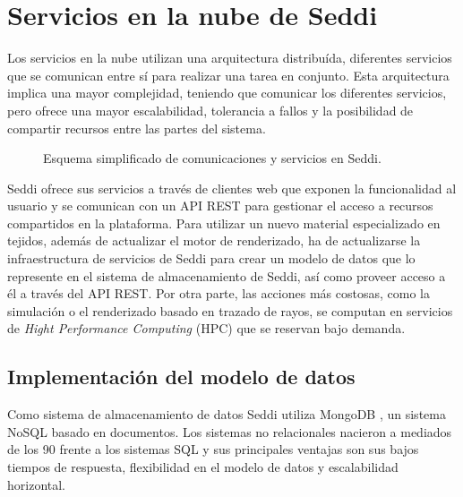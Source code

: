 \section{Servicios en la nube de Seddi}

\bgroup

  Los servicios en la nube utilizan una arquitectura distribu\'ida, diferentes servicios que se comunican entre s\'i para realizar
  una tarea en conjunto. Esta arquitectura implica una mayor complejidad, teniendo que comunicar los diferentes servicios,
  pero ofrece una mayor escalabilidad, tolerancia a fallos y la posibilidad de compartir recursos entre las partes del sistema.

  \begin{figure}[H]
    \vspace{0.5cm}
    \centering
    \caption{Esquema simplificado de comunicaciones y servicios en Seddi.}
    \vspace{0.5cm}
  \end{figure}

  Seddi ofrece sus servicios a trav\'es de clientes web que exponen la funcionalidad al usuario y se comunican con un API
  REST para gestionar el acceso a recursos compartidos en la plataforma. Para utilizar un nuevo material especializado en tejidos,
  adem\'as de actualizar el motor de renderizado, ha de actualizarse la infraestructura de servicios de Seddi para crear un modelo
  de datos que lo represente en el sistema de almacenamiento de Seddi, as\'i como proveer acceso a \'el a trav\'es del API
  REST. Por otra parte, las acciones m\'as costosas, como la simulaci\'on o el renderizado basado en trazado de rayos, se
  computan en servicios de \textit{Hight Performance Computing} (HPC) que se reservan bajo demanda.


  


\egroup

\subsection{Implementaci\'on del modelo de datos}
Como sistema de almacenamiento de datos Seddi utiliza MongoDB \autocite{mongodb}, un sistema NoSQL basado en documentos. Los sistemas no relacionales
nacieron a mediados de los 90 frente a los sistemas SQL y sus principales ventajas son sus bajos tiempos de respuesta, flexibilidad
en el modelo de datos y escalabilidad horizontal.\\

